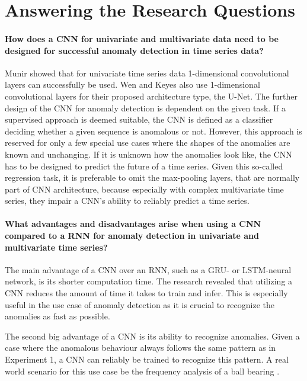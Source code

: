 \section{Answering the Research Questions}


\paragraph{How does a CNN for univariate and multivariate data need to be designed for successful anomaly detection in time series data?}

Munir \parencite*{Munir2019} showed that for univariate time series data 1-dimensional convolutional layers can successfully be used. Wen and Keyes \parencite*{Wen2019} also use 1-dimensional convolutional layers for their proposed architecture type, the U-Net. The further design of the CNN for anomaly detection is dependent on the given task. If a supervised approach is deemed suitable, the CNN is defined as a classifier deciding whether a given sequence is anomalous or not. However, this approach is reserved for only a few special use cases where the shapes of the anomalies are known and unchanging. If it is unknown how the anomalies look like, the CNN has to be designed to predict the future of a time series. Given this so-called regression task, it is preferable to omit the max-pooling layers, that are normally part of CNN architecture, because especially with complex multivariate time series, they impair a CNN's ability to reliably predict a time series.  

\paragraph{What advantages and disadvantages arise when using a CNN compared to a RNN for anomaly detection in univariate and multivariate time series?} The main advantage of a CNN over an RNN, such as a GRU- or LSTM-neural network, is its shorter computation time. The research revealed that utilizing a CNN reduces the amount of time it takes to train and infer. This is especially useful in the use case of anomaly detection as it is crucial to recognize the anomalies as fast as possible.

The second big advantage of a CNN is its ability to recognize anomalies. Given a case where the anomalous behaviour always follows the same pattern as in Experiment 1, a CNN can reliably be trained to recognize this pattern. A real world scenario for this use case be the frequency analysis of a ball bearing \parencite{Mais2002}.

